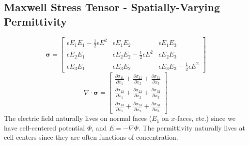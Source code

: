 \documentclass[final]{siamltex}
\def\sigmab {\boldsymbol{\sigma}}
\def\half   {\frac{1}{2}}
\begin{document}
\clearpage

\subsection{Maxwell Stress Tensor - Spatially-Varying Permittivity}
\begin{equation}
\sigmab =
\left[\begin{array}{ccc}
\epsilon E_1 E_1 - \half\epsilon E^2 & \epsilon E_1 E_2 & \epsilon E_1 E_3 \\
\epsilon E_2 E_1 & \epsilon E_2 E_2 - \half\epsilon E^2 & \epsilon E_2 E_3 \\
\epsilon E_3 E_1 & \epsilon E_3 E_2 & \epsilon E_3 E_3- \half\epsilon E^2 
\end{array}\right]
\end{equation}
\begin{equation}
\nabla\cdot\sigmab =
\left[\begin{array}{c}
\frac{\partial\sigma_{11}}{\partial x_1} + \frac{\partial\sigma_{21}}{\partial x_2} + \frac{\partial\sigma_{31}}{\partial x_3} \\
\frac{\partial\sigma_{12}}{\partial x_1} + \frac{\partial\sigma_{22}}{\partial x_2} + \frac{\partial\sigma_{32}}{\partial x_3} \\
\frac{\partial\sigma_{13}}{\partial x_1} + \frac{\partial\sigma_{23}}{\partial x_2} + \frac{\partial\sigma_{33}}{\partial x_3}
\end{array}\right]
\end{equation}
The electric field naturally lives on normal faces ($E_1$ on $x$-faces, etc.) since we 
have cell-centered potential $\Phi$, and $E=-\nabla\Phi$.
The permittivity naturally lives at cell-centers since they are often functions of 
concentration.
\end{document}
